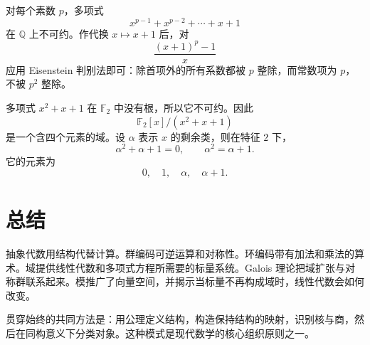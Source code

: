 \begin{example}
对每个素数 $p$，多项式
\[
    x^{p-1}+x^{p-2}+\cdots+x+1
\]
在 $\mathbb{Q}$ 上不可约。作代换 $x\mapsto x+1$ 后，对
\[
    \frac{(x+1)^p-1}{x}
\]
应用 Eisenstein 判别法即可：除首项外的所有系数都被 $p$ 整除，而常数项为 $p$，不被 $p^2$ 整除。
\end{example}

\begin{example}[一个有限域]
多项式 $x^2+x+1$ 在 $\mathbb{F}_2$ 中没有根，所以它不可约。因此
\[
    \mathbb{F}_2[x]/(x^2+x+1)
\]
是一个含四个元素的域。设 $\alpha$ 表示 $x$ 的剩余类，则在特征 $2$ 下，
\[
    \alpha^2+\alpha+1=0,
    \qquad
    \alpha^2=\alpha+1.
\]
它的元素为
\[
    0,\quad1,\quad\alpha,\quad\alpha+1.
\]
\end{example}


\section{总结}

抽象代数用结构代替计算。群编码可逆运算和对称性。环编码带有加法和乘法的算术。域提供线性代数和多项式方程所需要的标量系统。Galois 理论把域扩张与对称群联系起来。模推广了向量空间，并揭示当标量不再构成域时，线性代数会如何改变。

贯穿始终的共同方法是：用公理定义结构，构造保持结构的映射，识别核与商，然后在同构意义下分类对象。这种模式是现代数学的核心组织原则之一。
